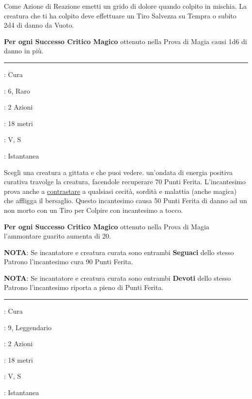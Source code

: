 \begin{multicols}{2}
Come Azione di Reazione emetti un grido di dolore quando colpito in mischia. La creatura che ti ha colpito deve effettuare un Tiro Salvezza su Tempra o subito 2d4 di danno da Vuoto.

\textbf{Per ogni Successo Critico Magico} ottenuto nella Prova di Magia causi 1d6 di danno in più.

\smallskip\noindent\rule{\linewidth}{2pt} \hypertarget{Guarigione}{}\smallskip{}
\noindent
\begin{description}[noitemsep, topsep=0pt, parsep=0pt, partopsep=0pt, leftmargin=0cm, labelwidth=2.8cm]
	\item[\textbf{Lista di Magia}]: Cura
	\item[\textbf{Livello}]: 6, Raro
	\item[\textbf{T. di Lancio}]: 2 Azioni
	\item[\textbf{Gittata}]: 18 metri
	\item[\textbf{Componenti}]: V, S
	\item[\textbf{Durata}]: Istantanea
\end{description}

Scegli una creatura a gittata e che puoi vedere. un'ondata di energia positiva curativa travolge la creatura, facendole recuperare 70 Punti Ferita. L'incantesimo prova anche a \hyperlink{contrastareincantesimi}{contrastare} a qualsiasi cecità, sordità e malattia (anche magica) che affligga il bersaglio. Questo incantesimo causa 50 Punti Ferita di danno ad un non morto con un Tiro per Colpire con incantesimo a tocco.

\textbf{Per ogni Successo Critico Magico} ottenuto nella Prova di Magia l'ammontare guarito aumenta di 20.

\textbf{NOTA}: Se incantatore e creatura curata sono entrambi \textbf{Seguaci} dello stesso Patrono l'incantesimo cura 90 Punti Ferita.

\textbf{NOTA}: Se incantatore e creatura curata sono entrambi \textbf{Devoti} dello stesso Patrono l'incantesimo riporta a pieno di Punti Ferita.

\smallskip\noindent\rule{\linewidth}{2pt} \hypertarget{Guarigione di Massa}{}\smallskip{}
\noindent
\begin{description}[noitemsep, topsep=0pt, parsep=0pt, partopsep=0pt, leftmargin=0cm, labelwidth=2.8cm]
	\item[\textbf{Lista di Magia}]: Cura
	\item[\textbf{Livello}]: 9, Leggendario
	\item[\textbf{T. di Lancio}]: 2 Azioni
	\item[\textbf{Gittata}]: 18 metri
	\item[\textbf{Componenti}]: V, S
	\item[\textbf{Durata}]: Istantanea
\end{description}


\end{multicols}
